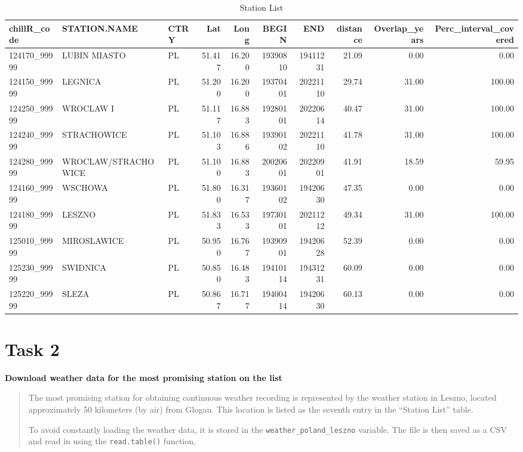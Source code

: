 \documentclass[
]{book}
\begin{document}
\begin{table}

\caption{\label{tab:unnamed-chunk-29}Station List}
\fontsize{10}{12}\selectfont
\begin{tabular}[t]{l|l|l|r|r|r|r|r|r|r}
\hline
chillR\_code & STATION.NAME & CTRY & Lat & Long & BEGIN & END & distance & Overlap\_years & Perc\_interval\_covered\\
\hline
124170\_99999 & LUBIN MIASTO & PL & 51.417 & 16.200 & 19390810 & 19411231 & 21.09 & 0.00 & 0.00\\
\hline
124150\_99999 & LEGNICA & PL & 51.200 & 16.200 & 19370401 & 20221110 & 29.74 & 31.00 & 100.00\\
\hline
124250\_99999 & WROCLAW I & PL & 51.117 & 16.883 & 19280101 & 20220614 & 40.47 & 31.00 & 100.00\\
\hline
124240\_99999 & STRACHOWICE & PL & 51.103 & 16.886 & 19390102 & 20221110 & 41.78 & 31.00 & 100.00\\
\hline
124280\_99999 & WROCLAW/STRACHOWICE & PL & 51.100 & 16.883 & 20020601 & 20220901 & 41.91 & 18.59 & 59.95\\
\hline
124160\_99999 & WSCHOWA & PL & 51.800 & 16.317 & 19360102 & 19420630 & 47.35 & 0.00 & 0.00\\
\hline
124180\_99999 & LESZNO & PL & 51.833 & 16.533 & 19730101 & 20211212 & 49.34 & 31.00 & 100.00\\
\hline
125010\_99999 & MIROSLAWICE & PL & 50.950 & 16.767 & 19390901 & 19420628 & 52.39 & 0.00 & 0.00\\
\hline
125230\_99999 & SWIDNICA & PL & 50.850 & 16.483 & 19410114 & 19431231 & 60.09 & 0.00 & 0.00\\
\hline
125220\_99999 & SLEZA & PL & 50.867 & 16.717 & 19400414 & 19420630 & 60.13 & 0.00 & 0.00\\
\hline
\end{tabular}
\end{table}

\hypertarget{task-2-4}{%
\section{Task 2}\label{task-2-4}}

\textbf{Download weather data for the most promising station on the list}

\begin{quote}
The most promising station for obtaining continuous weather recording is represented by the weather station in Leszno, located approximately 50 kilometers (by air) from Glogau. This location is listed as the seventh entry in the ``Station List'' table.

To avoid constantly loading the weather data, it is stored in the \texttt{weather\_poland\_leszno} variable. The file is then saved as a CSV and read in using the \texttt{read.table()} function.
\end{quote}
\end{document}
